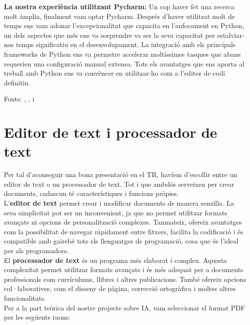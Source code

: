 \textbf{La nostra experiència utilitzant Pycharm:}
Un cop haver fet una recerca molt àmplia, finalment vam optar Pycharm. Després d'haver utilitzat molt de temps ens vam adonar l'excepcionalitat que capacita en l'enfocament en Python, un dels aspectes que més ens va sorprendre va ser la seva capacitat per estalviar-nos temps significatiu en el desenvolupament. La integració amb els principals frameworks de Python ens va permetre accelerar moltíssimes tasques que abans requerien una configuració manual extensa.  Tots els avantatges que ens aporta al treball amb Python ens va convèncer en utilitzar-ho com a l'editor de codi definitiu.



Fonts: \cite{VSCodeilessevesavantatges}, \cite{FundacioEclipse}, \cite{Totl'hoquehasdesaberdelPycharm} i~\cite{ToteslesnovetatsdePycharm}



\section{Editor de text i processador de text}\label{sec:4.2}

Per tal d'aconseguir una bona presentació en el TR, havíem d’escollir entre un editor de text o un processador de text. Tot i que ambdós serveixen per crear documents, cadascun té característiques i funcions pròpies.\\

L’\textbf{editor de text} permet crear i modificar documents de manera senzilla. La seva simplicitat pot ser un inconvenient, ja que no permet utilitzar formats avançats ni opcions de personalització complexes. Tanmateix, ofereix avantatges com la possibilitat de navegar ràpidament entre fitxers, facilita la codificació i és compatible amb gairebé tots els llenguatges de programació, cosa que és l'ideal per als programadors.\\

El \textbf{processador de text} és un programa més elaborat i complex. Aquesta complexitat permet utilitzar formats avançats i és més adequat per a documents professionals com currículums, llibres i altres publicacions. També ofereix opcions col·laboratives, com el disseny de pàgina, correcció ortogràfica i moltes altres funcionalitats.\\

Per a la part teòrica del nostre projecte sobre IA, vam seleccionar el format PDF per les següents raons:


